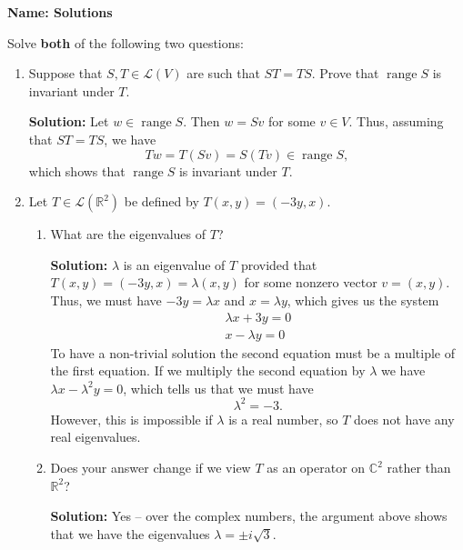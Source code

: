 \documentclass[12pt]{article}
\newcommand{\points}[1]{\marginpar{\hspace{24pt}[#1]}}
\newcommand{\R}{\mathbb{R}}
\newcommand{\C}{\mathbb{C}}
\DeclareMathOperator{\range}{range}
\begin{document}
\thispagestyle{fancy}
{\bf Name: Solutions}

\bigskip

Solve {\bf both} of the following two questions:
 \begin{enumerate}
 \item Suppose that $S,T\in\mathcal{L}(V)$ are such that $ST=TS$. Prove that $\range S$ is invariant under $T$. \points{5}

\bigskip

{\bf Solution:} Let $w\in\range S$. Then $w = Sv$ for some $v\in V$. Thus, assuming that $ST=TS$, we have
\[
 Tw = T(Sv) = S(Tv) \in\range S,
\]
which shows that $\range S$ is invariant under $T$.

\bigskip

 \item Let $T\in\mathcal{L}(\R^2)$ be defined by $T(x,y)=(-3y,x)$.
\begin{enumerate}
 \item What are the eigenvalues of $T$? \points{3}

\bigskip

{\bf Solution:} $\lambda$ is an eigenvalue of $T$ provided that $T(x,y)=(-3y,x)=\lambda (x,y)$ for some nonzero vector $v=(x,y)$. Thus, we must have $-3y = \lambda x$ and $x=\lambda y$, which gives us the system
\begin{align*}
\lambda x + 3y = 0\\
 x - \lambda y = 0
\end{align*}
To have a non-trivial solution the second equation must be a multiple of the first equation.
If we multiply the second equation by $\lambda$ we have $\lambda x - \lambda^2y=0$, which tells us that we must have
\[
 \lambda ^2 = -3.
\]
However, this is impossible if $\lambda$ is a real number, so $T$ does not have any real eigenvalues.

\bigskip

 
 \item Does your answer change if we view $T$ as an operator on $\C^2$ rather than $\R^2$? \points{2}

\bigskip

{\bf Solution:} Yes -- over the complex numbers, the argument above shows that we have the eigenvalues $\lambda = \pm i\sqrt{3}$.
\end{enumerate}

 \end{enumerate}
\end{document}
